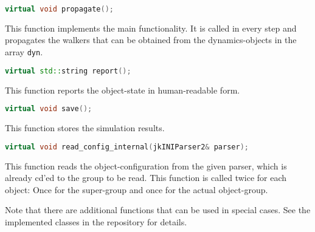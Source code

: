 \documentclass[a4paper,twoside,10pt]{report}
\begin{document}
\begin{lstlisting}[language=c++] 
	virtual void propagate();
\end{lstlisting}	
This function implements the main functionality. It is called in every step and propagates the walkers that can be obtained from the dynamics-objects in the array \texttt{dyn}. 

\begin{lstlisting}[language=c++] 
	virtual std::string report();
\end{lstlisting}	
This function reports the object-state in human-readable form.

\begin{lstlisting}[language=c++] 
	virtual void save();
\end{lstlisting}	
This function stores the simulation results.


\begin{lstlisting}[language=c++] 
	virtual void read_config_internal(jkINIParser2& parser);
\end{lstlisting}	
This function reads the object-configuration from the given parser, which is already cd'ed to the group to be read. This function is called twice for each object: Once for the super-group and once for the actual object-group.

Note that there are additional functions that can be used in special cases. See the implemented classes in the repository for details.
\end{document}
